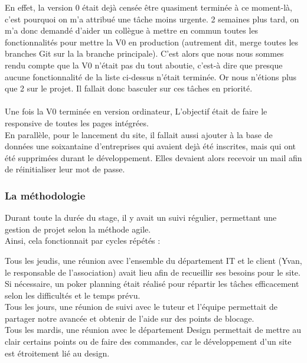 En effet, la version 0 était dejà censée être quasiment terminée à ce moment-là, c'est pourquoi on m'a attribué une tâche moins urgente. 
2 semaines plus tard, on m'a donc demandé d'aider un collègue à mettre en commun toutes les fonctionnalités pour mettre la V0 en production 
(autrement dit, merge toutes les branches Git sur la la branche principale).
C'est alors que nous nous sommes rendu compte que la V0 n'était pas du tout aboutie, c'est-à dire que presque aucune fonctionnalité de la liste ci-dessus n'était terminée. 
Or nous n'étions plus que 2 sur le projet. Il fallait donc basculer sur ces tâches en priorité.
\\\\
Une fois la V0 terminée en version ordinateur, L'objectif était de faire le responsive de toutes les pages intégrées. 
\\
En parallèle, pour le lancement du site, il fallait aussi ajouter à la base de données une soixantaine d'entreprises qui avaient dejà été inscrites, mais qui ont été supprimées durant le développement.
Elles devaient alors recevoir un mail afin de réinitialiser leur mot de passe.


\subsubsection{La méthodologie}

Durant toute la durée du stage, il y avait un suivi régulier, permettant une gestion de projet selon la méthode agile.\\

Ainsi, cela fonctionnait par cycles répétés :

Tous les jeudis, une réunion avec l'ensemble du département IT et le client (Yvan, le responsable de l'association) avait lieu afin de recueillir ses besoins pour le site.\\
Si nécessaire, un poker planning était réalisé pour répartir les tâches efficacement selon les difficultés et le temps prévu.\\

Tous les jours, une réunion de suivi avec le tuteur et l'équipe permettait de partager notre avancée et obtenir de l'aide sur des points de blocage.\\

Tous les mardis, une réunion avec le département Design permettait de mettre au clair certains points ou de faire des commandes, car le développement d'un site est étroitement lié au design.\\

